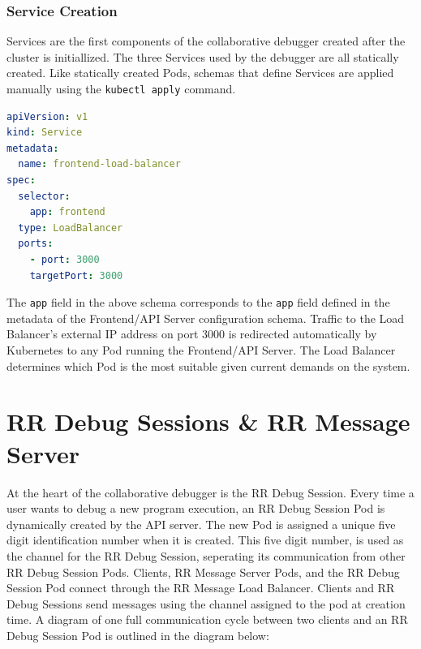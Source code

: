 \documentclass[12pt]{article}
\begin{document}
\subsubsection{Service Creation}

Services are the first components of the collaborative debugger
created after the cluster is initiallized.  The three Services used by
the debugger are all statically created.  Like statically created
Pods, schemas that define Services are applied manually using the
\lstinline{kubectl apply} command.

\begin{lstlisting}[language=YAML,basicstyle=\linespread{0.5}\ttfamily,caption={Frontend Load Balancer Schema},captionpos=b]
apiVersion: v1
kind: Service
metadata:
  name: frontend-load-balancer
spec:
  selector:
    app: frontend
  type: LoadBalancer
  ports:
    - port: 3000
    targetPort: 3000
\end{lstlisting}

The \lstinline{app} field in the above schema corresponds to the
\lstinline{app} field defined in the metadata of the Frontend/API
Server configuration schema.  Traffic to the Load Balancer's external
IP address on port 3000 is redirected automatically by Kubernetes to
any Pod running the Frontend/API Server.  The Load Balancer determines
which Pod is the most suitable given current demands on the system.

\section{RR Debug Sessions \& RR Message Server}

At the heart of the collaborative debugger is the RR Debug Session.
Every time a user wants to debug a new program execution, an RR Debug
Session Pod is dynamically created by the API server.  The new Pod is
assigned a unique five digit identification number when it is created.
This five digit number, is used as the channel for the RR Debug
Session, seperating its communication from other RR Debug Session
Pods.  Clients, RR Message Server Pods, and the RR Debug Session Pod
connect through the RR Message Load Balancer.  Clients and RR Debug
Sessions send messages using the channel assigned to the pod at
creation time.  A diagram of one full communication cycle between two
clients and an RR Debug Session Pod is outlined in the diagram below:
\end{document}
